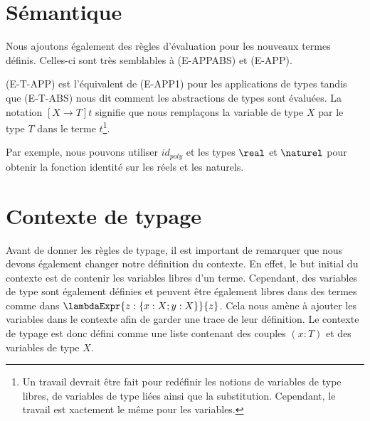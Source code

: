 \section{Sémantique}

Nous ajoutons également des règles d'évaluation pour les nouveaux termes
définis. Celles-ci sont très semblables à (E-APPABS) et (E-APP).


(E-T-APP) est l'équivalent de (E-APP1) pour les applications de types tandis que
(E-T-ABS) nous dit comment les abstractions de types sont évaluées. La notation
$[X \rightarrow T]t$ signifie que nous remplaçons la variable de type $X$ par le
type $T$ dans le terme $t$\footnote{Un travail devrait être fait pour redéfinir
  les notions de variables de type libres, de variables de type liées ainsi que
  la substitution. Cependant, le travail est xactement le même pour les
  variables.}.

Par exemple, nous pouvons utiliser $id_{poly}$ et les types $\real$ et
$\naturel$ pour obtenir la fonction identité sur les réels et les naturels.


\section{Contexte de typage}

Avant de donner les règles de typage, il est important de remarquer que nous
devons également changer notre définition du contexte. En effet, le but initial
du contexte est de contenir les variables libres d'un terme. Cependant, des
variables de type sont également définies et peuvent être également libres dans des
termes comme dans $\lambdaExpr{z : \left\{ x : X ; y : X \right\}}{z}$.
Cela nous amène à ajouter les variables dans le contexte afin de garder une
trace de leur définition. Le contexte de typage
est donc défini comme une liste contenant des couples $(x : T)$ et des variables
de type $X$.

